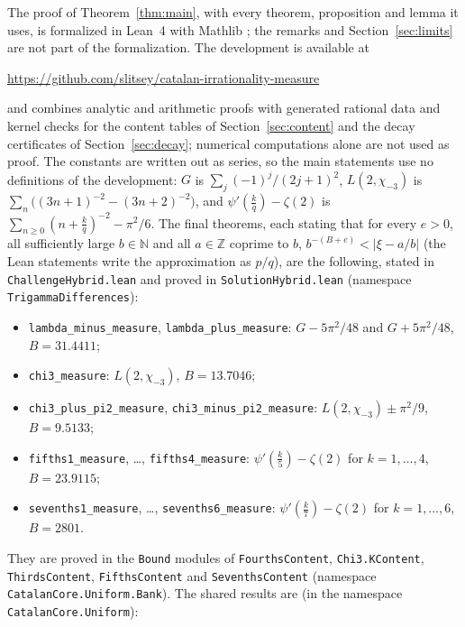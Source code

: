 \documentclass[11pt]{amsart}
\newcommand{\FormalizationURL}{https://github.com/slitsey/catalan-irrationality-measure}
\newcommand{\FormalizationLink}{\url{\FormalizationURL}}
\theoremstyle{definition}
\theoremstyle{remark}
\numberwithin{equation}{section}
\newcommand{\Z}{\mathbb Z}
\newcommand{\N}{\mathbb N}
\newcommand{\lean}[1]{\nolinkurl{#1}}
\newcommand{\MuLamU}{31.4411}
\newcommand{\MuThirdsU}{9.5133}
\newcommand{\MuFifthsU}{23.9115}
\newcommand{\MuSeventhsU}{2801}
\newcommand{\MuChi}{13.7046}
\begin{document}
The proof of Theorem~\ref{thm:main}, with every theorem, proposition and lemma it uses, is formalized in Lean~4
\cite{Lean4} with Mathlib \cite{Mathlib}; the remarks and Section~\ref{sec:limits} are not part of the formalization. The
development is available at
\begin{center}
\FormalizationLink
\end{center}
and combines analytic and arithmetic proofs with generated rational data and kernel checks for the content tables of
Section~\ref{sec:content} and the decay certificates of Section~\ref{sec:decay}; numerical computations alone are not used as
proof. The constants are written out as series, so the main statements use no definitions of the development: $G$ is
$\sum_j(-1)^j/(2j+1)^2$, $L(2,\chi_{-3})$ is $\sum_n\bigl((3n+1)^{-2}-(3n+2)^{-2}\bigr)$, and $\psi'(\frac kq)-\zeta(2)$ is
$\sum_{n\ge0}(n+\frac kq)^{-2}-\pi^2/6$. The final theorems, each stating that for every $e>0$, all sufficiently large
$b\in\N$ and all $a\in\Z$ coprime to $b$, $b^{-(B+e)}<|\xi-a/b|$ (the Lean statements write the approximation as $p/q$),
are the following, stated in \lean{ChallengeHybrid.lean} and proved in \lean{SolutionHybrid.lean} (namespace \lean{TrigammaDifferences}):
\begin{itemize}
\item \lean{lambda_minus_measure}, \lean{lambda_plus_measure}: $G-5\pi^2/48$ and $G+5\pi^2/48$, $B=\MuLamU$;
\item \lean{chi3_measure}: $L(2,\chi_{-3})$, $B=\MuChi$;
\item \lean{chi3_plus_pi2_measure}, \lean{chi3_minus_pi2_measure}:
 $L(2,\chi_{-3})\pm\pi^2/9$, $B=\MuThirdsU$;
\item \lean{fifths1_measure}, \dots, \lean{fifths4_measure}:
 $\psi'(\frac k5)-\zeta(2)$ for $k=1,\dots,4$, $B=\MuFifthsU$;
\item \lean{sevenths1_measure}, \dots, \lean{sevenths6_measure}:
 $\psi'(\frac k7)-\zeta(2)$ for $k=1,\dots,6$, $B=\MuSeventhsU$.
\end{itemize}
They are proved in the \lean{Bound} modules of \lean{FourthsContent}, \lean{Chi3.KContent}, \lean{ThirdsContent}, \lean{FifthsContent} and \lean{SeventhsContent} (namespace \lean{CatalanCore.Uniform.Bank}).
The shared results are (in the namespace \lean{CatalanCore.Uniform}):
\end{document}
